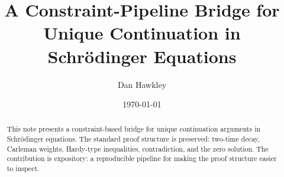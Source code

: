 \documentclass[11pt]{article}
\title{A Constraint-Pipeline Bridge for Unique Continuation in Schr\"odinger Equations}
\author{Dan Hawkley}
\date{\today}
\begin{document}
\maketitle

\begin{abstract}
This note presents a constraint-based bridge for unique continuation arguments in Schr\"odinger equations.
The standard proof structure is preserved: two-time decay, Carleman weights, Hardy-type inequalities, contradiction, and the zero solution.
The contribution is expository: a reproducible pipeline for making the proof structure easier to inspect.
\end{abstract}










\end{document}
